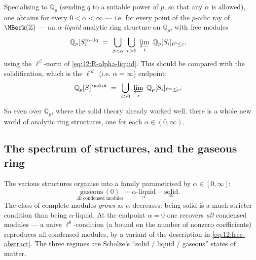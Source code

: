 \begin{definition}
\label{def:12:alpha-liquid-Qp}
Specialising to $\mathbb{Q}_p$ (sending $q$ to a suitable power of $p$, so that
any $\alpha$ is allowed), one obtains for every $0<\alpha<\infty$ --- i.e. for
every point of the $p$-adic ray of $\MBerk(\mathbb{Z})$ --- an
\emph{$\alpha$-liquid} analytic ring structure on $\mathbb{Q}_p$, with free
modules
\begin{equation*}
\mathbb{Q}_p[S]^{\alpha\text{-}\mathrm{liq}}\ =\
\bigcup_{\beta<\alpha}\ \bigcup_{c>0}\ \varprojlim_i\
\mathbb{Q}_p[S_i]_{\ell^{\beta}\le c},
\end{equation*}
using the $\ell^{\beta}$-norm of \eqref{eq:12:R-alpha-liquid}. This should be
compared with the solidification, which is the $\ell^{\infty}$ (i.e.
$\alpha=\infty$) endpoint:
\begin{equation*}
\mathbb{Q}_p[S]^{\solid}\ =\ \bigcup_{c>0}\ \varprojlim_i\
\mathbb{Q}_p[S_i]_{\ell^{\infty}\le c}.
\end{equation*}
\end{definition}

So even over $\mathbb{Q}_p$, where the solid theory already worked well, there is
a whole new world of analytic ring structures, one for each $\alpha\in(0,\infty)$.

\subsection{The spectrum of structures, and the gaseous ring}

\begin{remark}[Solid, liquid, gaseous]
\label{rmk:12:states-of-matter}
The various structures organise into a family parametrised by
$\alpha\in[0,\infty]$:
\begin{equation}
\label{eq:12:spectrum-interval}
\underset{\text{all condensed modules}}{\text{gaseous}\ (0)}
\ \cdots\ \underset{\alpha}{\alpha\text{-liquid}}\ \cdots\
\underset{\infty}{\text{solid}}.
\end{equation}
The class of complete modules \emph{grows} as $\alpha$ decreases: being solid is
a much stricter condition than being $\alpha$-liquid. At the endpoint $\alpha=0$
one recovers \emph{all} condensed modules --- a naive $\ell^{0}$-condition (a
bound on the number of nonzero coefficients) reproduces all condensed modules,
by a variant of the description in \eqref{eq:12:free-abstract}. The three regimes
are Scholze's ``solid / liquid / gaseous'' states of matter.
\end{remark}

